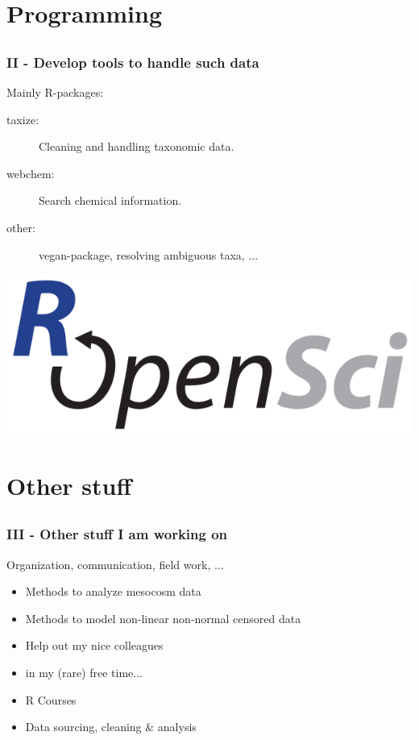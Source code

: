 \documentclass[12pt, t]{beamer}
\begin{document}
\section{Programming}
\subsection{}
\begin{frame}
\frametitle{II - Develop tools to handle such data}
\vspace{1em}
Mainly R-packages:

\begin{description}
	\item[taxize: ] Cleaning and handling \textcolor{hilight}{taxonomic} data.
	\item[webchem: ] Search \textcolor{hilight}{chemical} information.
	\item[other: ] vegan-package, resolving ambiguous taxa, ...
\end{description}
\vfill
\colorbox{white}{\includegraphics[width =.3\textwidth]{fig/ropensci.png}}
\end{frame}



\section{Other stuff}
\subsection{}
\begin{frame}
\frametitle{III - Other stuff I am working on}
\vspace{1em}
\begin{description}
\setlength\itemsep{1em}
\item[Field study:  ]{Organization, communication, field work, ...	}
\item[Statistics: ] {
	\begin{itemize}
		\item Methods to analyze mesocosm data
		\item Methods to model non-linear non-normal censored data
		\item Help out my nice colleagues
	\end{itemize}
}
\item[Freelance: ] {
	\begin{itemize}
		\item in my (rare) free time...
		\item R Courses
		\item Data sourcing, cleaning \& analysis
	\end{itemize}
}
\end{description}
\end{frame}
\end{document}
